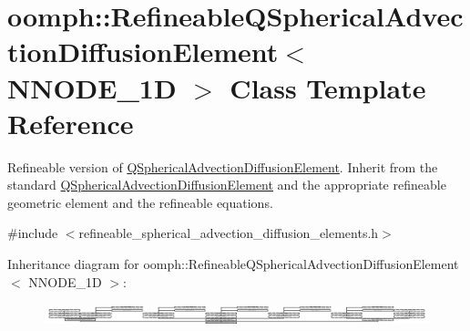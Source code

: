 \hypertarget{classoomph_1_1RefineableQSphericalAdvectionDiffusionElement}{}\section{oomph\+:\+:Refineable\+Q\+Spherical\+Advection\+Diffusion\+Element$<$ N\+N\+O\+D\+E\+\_\+1D $>$ Class Template Reference}
\label{classoomph_1_1RefineableQSphericalAdvectionDiffusionElement}


Refineable version of \hyperlink{classoomph_1_1QSphericalAdvectionDiffusionElement}{Q\+Spherical\+Advection\+Diffusion\+Element}. Inherit from the standard \hyperlink{classoomph_1_1QSphericalAdvectionDiffusionElement}{Q\+Spherical\+Advection\+Diffusion\+Element} and the appropriate refineable geometric element and the refineable equations.  




{\ttfamily \#include $<$refineable\+\_\+spherical\+\_\+advection\+\_\+diffusion\+\_\+elements.\+h$>$}

Inheritance diagram for oomph\+:\+:Refineable\+Q\+Spherical\+Advection\+Diffusion\+Element$<$ N\+N\+O\+D\+E\+\_\+1D $>$\+:\begin{figure}[H]
\begin{center}
\leavevmode
\includegraphics[height=0.651163cm]{classoomph_1_1RefineableQSphericalAdvectionDiffusionElement}
\end{center}
\end{figure}
